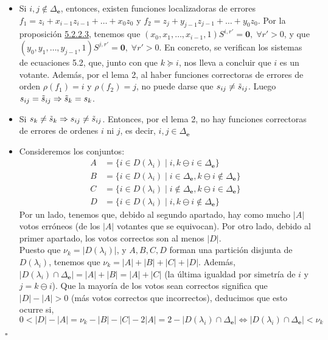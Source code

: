 \documentclass[11pt,spanish]{book}
\newcommand{\qed}{\begin{flushright} $\square$ \end{flushright}}
\begin{document}
\begin{itemize}
    \item Si $i, j\notin \Delta_{\mathbf{e}}$, entonces, existen funciones localizadoras de errores $f_1=z_i+x_{i-1}z_{i-1}+\ldots+x_0z_0$ y $f_2=z_j+y_{j-1}z_{j-1}+\ldots+y_0z_0$.
    Por la proposición \hyperlink{prop5.2.2.3}{5.2.2.3}, tenemos que $(x_0,x_1,\ldots,x_{i-1},1)S^{i,r'}=\mathbf{0},\;\forall r'>0$, 
    y que $(y_0,y_1,\ldots,y_{j-1},1)S^{j,r'}=\mathbf{0},\;\forall r'>0$. En concreto, se verifican los sistemas de ecuaciones 5.2, que, junto con que $k\succeq i$, nos lleva a concluir que $i$ es un votante. Además, por el lema 2, al haber funciones correctoras de errores de orden $\rho(f_1)=i$ y $\rho(f_2)=j$, no puede darse que $s_{ij}\neq \Tilde{s}_{ij}$. Luego $s_{ij} = \tilde{s}_{ij}\Rightarrow \Tilde{s}_k = s_k$.
    \item Si $s_k\neq \Tilde{s}_k\Rightarrow s_{ij} \neq \tilde{s}_{ij}$. Entonces, por el lema 2, no hay funciones correctoras de errores de ordenes $i$ ni $j$, es decir, $i,j\in \Delta_{\mathbf{e}}$
    \item Consideremos los conjuntos:
    \begin{align*}
        A&=\{i\in D(\lambda_i)\;|\; i, k\ominus i\in \Delta_{\mathbf{e}}\}\\
        B&=\{i\in D(\lambda_i)\;|\; i\in \Delta_{\mathbf{e}}, k\ominus i\notin \Delta_{\mathbf{e}}\}\\
        C&=\{i\in D(\lambda_i)\;|\; i\notin \Delta_{\mathbf{e}}, k\ominus i\in \Delta_{\mathbf{e}}\}\\
        D&=\{i\in D(\lambda_i)\;|\; i, k\ominus i\notin \Delta_{\mathbf{e}}\}
    \end{align*}
    Por un lado, tenemos que, debido al segundo apartado, hay como mucho $|A|$ votos erróneos (de los $|A|$ votantes que se equivocan). Por otro lado, debido al primer apartado, los votos correctos son al menos $|D|$. 
    \\Puesto que $\nu_k = |D(\lambda_i)|$, y $A, B, C, D$ forman una partición disjunta de $D(\lambda_i)$, tenemos que $\nu_k = |A|+|B|+|C|+|D|$. Además, $|D(\lambda_i) \cap \Delta_{\mathbf{e}}|= |A|+|B|=|A|+|C|$ (la última igualdad por simetría de $i$ y $j=k\ominus i$). 
    Que la mayoría de los votos sean correctos significa que $|D|-|A|>0$ (más votos correctos que incorrectos), deducimos que esto ocurre si,
    $0<|D|-|A|=\nu_k-|B|-|C|-2|A|=2-|D(\lambda_i) \cap \Delta_{\mathbf{e}}|\Leftrightarrow |D(\lambda_i) \cap \Delta_{\mathbf{e}}|<\nu_k$
\end{itemize}
\qed
\end{document}
